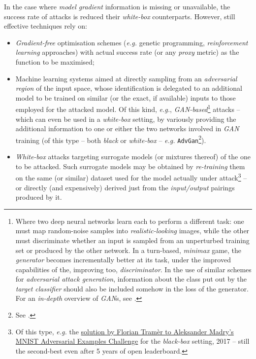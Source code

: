 In the case where \textit{model gradient} information is missing or unavailable, the success rate of attacks is reduced \wrt their \textit{white-box} counterparts. However, still effective techniques rely on:
\begin{itemize}
     \item \textit{Gradient-free} optimisation schemes (\textit{e.g.} genetic programming, \textit{reinforcement learning} approaches) with actual success rate (or any \textit{proxy} metric) as the function to be maximised;
     \item Machine learning systems aimed at directly sampling from an \textit{adversarial region} of the input space, whose identification is delegated to an additional model to be trained on similar (or the exact, if available) inputs to those employed for the attacked model. Of this kind, \textit{e.g.}, \textit{GAN-based}\footnote{Where two deep neural networks learn each to perform a different task: one must map random-noise samples into \textit{realistic-looking} images, while the other must discriminate whether an input is sampled from an unperturbed training set or produced by the other network. In a turn-based, \textit{minimax} game, the \textit{generator} becomes incrementally better at its task, under the improved capabilities of the, improving too, \textit{discriminator}. In the use of similar schemes for \textit{adversarial attack generation}, information about the class put out by the \textit{target classifier} should also be included somehow in the loss of the generator. For an \textit{in-depth} overview of \textit{GAN}s, see \cite{GoodfellowEtAl2014GANs}.} attacks -- which can even be used in a \textit{white-box} setting, by variously providing the additional information to one or either the two networks involved in \textit{GAN} training (of this type -- both \textit{black} or \textit{white}\textit{-box} -- \textit{e.g.} \texttt{AdvGan}\footnote{See \cite{XiaoEtAl2018Generating}.}).
     \item \textit{White-box} attacks targeting surrogate models (or mixtures thereof) of the one to be attacked. Such surrogate models may be obtained by \textit{re-training} them on the same (or similar) dataset used for the model actually under attack\footnote{Of this type, \textit{e.g.} the \href{https://cutt.ly/tramer_mnist_pgd_on_copies}{solution by Florian Tramèr to Aleksander Madry's MNIST Adversarial Examples Challenge} for the \textit{black-box} setting, 2017 -- still the second-best even after 5 years of open leaderboard.} -- or directly (and expensively) derived just from the \textit{input/output} pairings produced by it.
\end{itemize}

